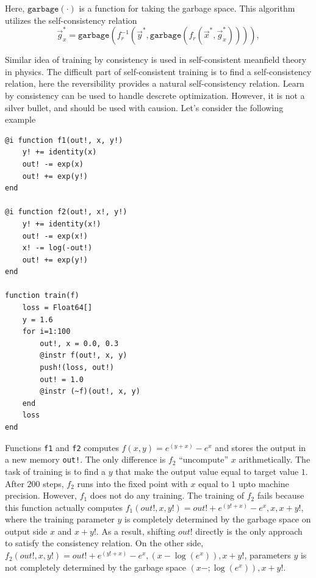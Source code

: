 \documentclass[aps,twocolumn,longbibliography,english,superscriptaddress,prr]{revtex4-1}
\newcommand{\<}{\langle}
\renewcommand{\>}{\rangle}
\newcommand{\vx}{{\vec x}}
\newcommand{\vg}{{\vec g}}
\newcommand{\vy}{{\vec y}}
\newcommand{\garbage}{{\texttt{garbage}}}
\theoremstyle{definition}\newtheorem{definition}{\textit{Definition}}
\begin{document}
Here, $\garbage(\cdot)$ is a function for taking the garbage space.
This algorithm utilizes the self-consistency relation
\begin{equation}\label{eq:selfconsistent}
    \vg_x^* = \garbage(f_r^{-1}(\vy^*, \garbage(f_r(\vx^*, \vg^*_x)))),
\end{equation}

Similar idea of training by consistency is used in self-consistent meanfield theory~\cite{} in physics.
The difficult part of self-consistent training is to find a self-consistency relation, here the reversibility provides a natural self-consistency relation.
Learn by consistency can be used to handle descrete optimization. However, it is not a silver bullet, and should be used with causion.
Let's consider the following example

\begin{minipage}{.44\textwidth}
\begin{lstlisting}[basicstyle=\small\ttfamily,columns=fullflexible]
@i function f1(out!, x, y!)
    y! += identity(x)
    out! -= exp(x)
    out! += exp(y!)
end

@i function f2(out!, x!, y!)
    y! += identity(x!)
    out! -= exp(x!)
    x! -= log(-out!)
    out! += exp(y!)
end

function train(f)
    loss = Float64[]
    y = 1.6
    for i=1:100
        out!, x = 0.0, 0.3
        @instr f(out!, x, y)
        push!(loss, out!)
        out! = 1.0
        @instr (~f)(out!, x, y)
    end
    loss
end
\end{lstlisting}
\end{minipage}

Functions \texttt{f1} and \texttt{f2} computes $f(x, y) = e^{(y+x)} - e^x$ and stores the output in a new memory \texttt{out!}.
The only difference is $f_2$ ``uncompute'' $x$ arithmetically.
The task of training is to find a $y$ that make the output value equal to target value $1$.
After $200$ steps, $f_2$ runs into the fixed point with $x$ equal to $1$ upto machine precision.
However, $f_1$ does not do any training.
The training of $f_2$ fails because this function actually computes $f_1(out!, x, y!) = out! + e^{(y!+x)} - e^x, x, x+y!$, where the training parameter $y$ is completely determined by the garbage space on output side $x$ and $x+y!$. As a result, shifting $out!$ directly is the only approach to satisfy the consistency relation. On the other side, $f_2(out!, x, y!) = out! + e^{(y!+x)} - e^x, \left(x-\log(e^x)\right), x+y!$, parameters $y$ is not completely determined by the garbage space $\left(x-;\log(e^x)\right), x+y!$.
\end{document}

